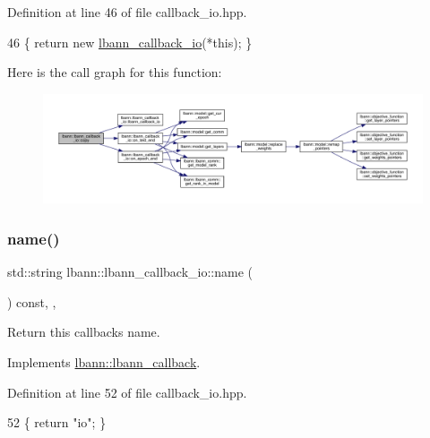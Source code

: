 Definition at line 46 of file callback\+\_\+io.\+hpp.


\begin{DoxyCode}
46 \{ \textcolor{keywordflow}{return} \textcolor{keyword}{new} \hyperlink{classlbann_1_1lbann__callback__io_a12c89d246c657ca588d3fb637ef79183}{lbann\_callback\_io}(*\textcolor{keyword}{this}); \}
\end{DoxyCode}
Here is the call graph for this function\+:\nopagebreak
\begin{figure}[H]
\begin{center}
\leavevmode
\includegraphics[width=350pt]{classlbann_1_1lbann__callback__io_aec8c75427c424999d01a18a9fb8e0b0d_cgraph}
\end{center}
\end{figure}
\mbox{\label{classlbann_1_1lbann__callback__io_ac0b1327364b2ae3c7b7e4987aef70e33}} 
\subsubsection{\texorpdfstring{name()}{name()}}
{\footnotesize\ttfamily std\+::string lbann\+::lbann\+\_\+callback\+\_\+io\+::name (\begin{DoxyParamCaption}{ }\end{DoxyParamCaption}) const\hspace{0.3cm}{\ttfamily [inline]}, {\ttfamily [override]}, {\ttfamily [virtual]}}

Return this callback\textquotesingle{}s name. 

Implements \hyperlink{classlbann_1_1lbann__callback_a7522c7a14f1d6a1ea762cc2d7248eb3a}{lbann\+::lbann\+\_\+callback}.



Definition at line 52 of file callback\+\_\+io.\+hpp.


\begin{DoxyCode}
52 \{ \textcolor{keywordflow}{return} \textcolor{stringliteral}{"io"}; \}
\end{DoxyCode}
\mbox{\label{classlbann_1_1lbann__callback__io_a118c5cb8a9c83661a67569df890676e2}} 
